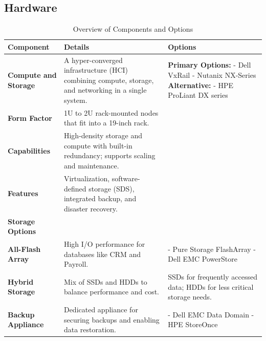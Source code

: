 \documentclass{llncs}
\begin{document}
\subsection{Hardware}
\vspace{-10pt}
\begin{table}[H]
  \setlength{\tabcolsep}{5pt} %
  \renewcommand{\arraystretch}{1.2} %
  \centering
  \begin{tabular}{|p{3cm}|p{8cm}|p{4cm}|}
  \hline
  \textbf{Component} & \textbf{Details} & \textbf{Options} \\
  \hline
  \textbf{Compute and Storage} & 
  A hyper-converged infrastructure (HCI) combining compute, storage, and networking in a single system. & 
  \textbf{Primary Options:} \newline 
  - Dell VxRail \newline 
  - Nutanix NX-Series \newline 
  \textbf{Alternative:} \newline 
  - HPE ProLiant DX series \\
  \hline
  \textbf{Form Factor} & 
  1U to 2U rack-mounted nodes that fit into a 19-inch rack. & 
  \\
  \hline
  \textbf{Capabilities} & 
  High-density storage and compute with built-in redundancy; supports scaling and maintenance. & 
  \\
  \hline
  \textbf{Features} & 
  Virtualization, software-defined storage (SDS), integrated backup, and disaster recovery. & 
  \\
  \hline
  \textbf{Storage Options} & 
  & 
  \\
  \hline
  \textbf{All-Flash Array} & 
  High I/O performance for databases like CRM and Payroll. & 
  - Pure Storage FlashArray \newline 
  - Dell EMC PowerStore \\
  \hline
  \textbf{Hybrid Storage} & 
  Mix of SSDs and HDDs to balance performance and cost. & 
  SSDs for frequently accessed data; HDDs for less critical storage needs. \\
  \hline
  \textbf{Backup Appliance} & 
  Dedicated appliance for securing backups and enabling data restoration. & 
  - Dell EMC Data Domain \newline 
  - HPE StoreOnce \\
  \hline
  \end{tabular}
  \caption{Overview of Components and Options}
  \label{tab:components}
  \end{table}  
\end{document}
